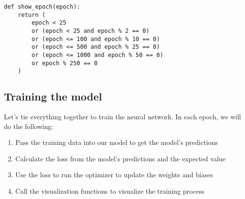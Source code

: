 \documentclass[openany]{book}
\providecommand{\tightlist}{%
      \setlength{\itemsep}{0pt}\setlength{\parskip}{0pt}}
\begin{document}
\begin{tcolorbox}
\begin{verbatim}
def show_epoch(epoch):
    return (
        epoch < 25
        or (epoch < 25 and epoch % 2 == 0)
        or (epoch <= 100 and epoch % 10 == 0)
        or (epoch <= 500 and epoch % 25 == 0)
        or (epoch <= 1000 and epoch % 50 == 0)
        or epoch % 250 == 0
    )
\end{verbatim}
\end{tcolorbox}

    \subsection{Training the model}\label{training-the-model}

Let's tie everything together to train the neural network. In each
epoch, we will do the following:

\begin{enumerate}
\def\labelenumi{\arabic{enumi}.}
\tightlist
\item
  Pass the training data into our model to get the model's predictions
\item
  Calculate the loss from the model's predictions and the expected value
\item
  Use the loss to run the optimizer to update the weights and biases
\item
  Call the visualization functions to visualize the training process
\end{enumerate}
\end{document}
